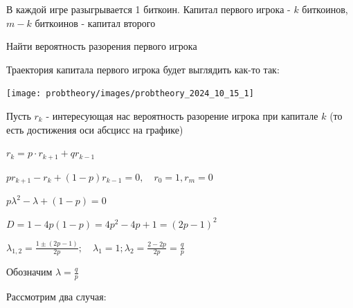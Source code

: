 \documentclass[12pt]{article}
\begin{document}
    В каждой игре разыгрывается 1 биткоин. Капитал первого игрока - $k$ биткоинов, $m - k$ биткоинов - капитал второго

    Найти вероятность разорения первого игрока

    Траектория капитала первого игрока будет выглядить как-то так:

    \begin{center}
        \texttt{[image: probtheory/images/probtheory\_2024\_10\_15\_1]}
    \end{center}

    Пусть $r_k$ - интересующая нас вероятность разорение игрока при капитале $k$ (то есть достижения оси абсцисс на графике)

    $r_k = p \cdot r_{k + 1} + q r_{k - 1}$

    $pr_{k + 1} - r_k + (1 - p) r_{k - 1} = 0, \quad r_0 = 1, r_{m} = 0$

    $p\lambda^2 - \lambda + (1 - p) = 0$

    $D = 1 - 4p(1 - p) = 4p^2 - 4p + 1 = (2p - 1)^2$

    $\lambda_{1, 2} = \frac{1 \pm (2p - 1)}{2p}; \quad \lambda_1 = 1; \lambda_2 = \frac{2 - 2p}{2p} = \frac{q}{p}$

    Обозначим $\lambda = \frac{q}{p}$

    Рассмотрим два случая: 
\end{document}
